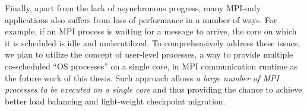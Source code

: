 Finally, apart from the lack of asynchronous progress, many MPI-only
applications also suffers from loss of performance in a number of ways.
For example, if an MPI process is waiting for a message to arrive,
the core on which it is scheduled is idle and underutilized. To comprehensively
address these issues, we plan to utilize the concept of user-level processes,
a way to provide multiple co-scheduled ``OS processes'' on a single core,
in MPI communication runtime as the future work of this thesis. Such approach
allows \textit{a large number of MPI processes to be executed on a single
core} and thus providing the chance to achieve better load balancing
and light-weight checkpoint migration.

\clearpage

